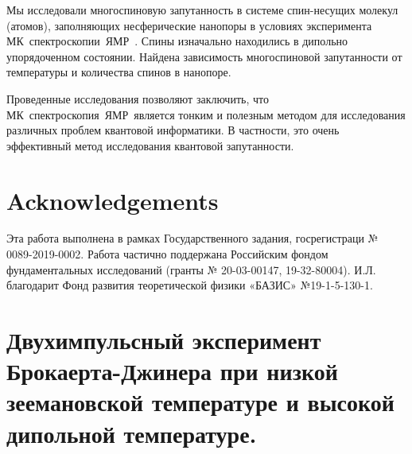 \documentclass[utf8]{jetp}
\begin{document}
{Мы исследовали многоспиновую запутанность в системе спин-несущих молекул (атомов), заполняющих несферические нанопоры в условиях эксперимента МК~спектроскопии~ЯМР~.
Спины изначально находились в дипольно упорядоченном состоянии.
Найдена зависимость многоспиновой запутанности от температуры и количества спинов в нанопоре.

Проведенные исследования позволяют заключить, что МК~спектроскопия~ЯМР~является тонким и полезным методом для исследования различных проблем квантовой информатики.
В частности, это очень эффективный метод исследования квантовой запутанности.


\section{Acknowledgements}
Эта работа выполнена в рамках Государственного задания, госрегистраци № 0089-2019-0002.
Работа частично поддержана Российским фондом фундаментальных исследований (гранты № 20-03-00147, 19-32-80004).
И.Л. благодарит Фонд развития теоретической физики «БАЗИС» №19-1-5-130-1.



\appendix
\section{Двухимпульсный эксперимент Брокаерта-Джинера при низкой зеемановской температуре и высокой дипольной температуре.}

}
\end{document}
